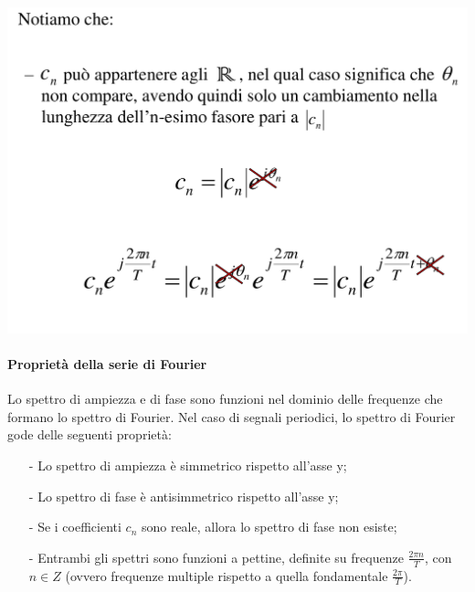 \documentclass[a4paper, 10pt]{report}
\begin{document}
\vspace{1cm}
\begin{tcolorbox}[title=\textbf{Caso coefficiente reale}]
\begin{center}
\includegraphics[scale=0.50]{reali.pdf}
\end{center}
\end{tcolorbox}

\paragraph*{Proprietà della serie di Fourier} Lo spettro di ampiezza e di fase sono funzioni nel dominio delle frequenze che formano lo spettro di Fourier. Nel caso di segnali periodici, lo spettro di Fourier gode delle seguenti proprietà:
\begin{itemize}
\item[-] Lo spettro di ampiezza è simmetrico rispetto all'asse y;
\item[-] Lo spettro di fase è antisimmetrico rispetto all'asse y;
\item[-] Se i coefficienti $c_n$ sono reale, allora lo spettro di fase non esiste;
\item[-] Entrambi gli spettri sono funzioni a pettine, definite su frequenze $\frac{2 \pi  n}{T}$, con $n \in Z$ (ovvero frequenze multiple rispetto a quella fondamentale $\frac{2 \pi}{T}$).
\end{itemize}
\end{document}
